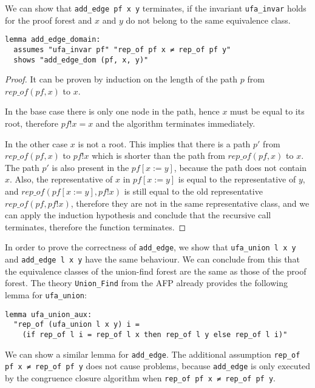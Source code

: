 We can show that \lstinline{add_edge pf x y} terminates, if the invariant \lstinline{ufa_invar} holds for the proof forest and $x$ and $y$ do not belong to the same equivalence class.

\begin{lstlisting}
lemma add_edge_domain:
  assumes "ufa_invar pf" "rep_of pf x ≠ rep_of pf y"
  shows "add_edge_dom (pf, x, y)"
\end{lstlisting}

\begin{proof}
It can be proven by induction on the length of the path $p$ from $rep\_of(pf, x)$ to $x$.

In the base case there is only one node in the path, hence $x$ must be equal to its root, therefore $pf ! x = x$ and the algorithm terminates immediately.

In the other case $x$ is not a root. This implies that there is a path $p'$ from $rep\_of(pf,x)$ to $pf!x$ which is shorter than the path from $rep\_of(pf,x)$ to $x$. The path $p'$ is also present in the $pf[x := y]$, because the path does not contain $x$. Also, the representative of $x$ in $pf[x := y]$ is equal to the representative of $y$, and $rep\_of(pf[x := y],pf!x)$ is still equal to the old representative $rep\_of(pf,pf!x)$, therefore they are not in the same representative class, and we can apply the induction hypothesis and conclude that the recursive call terminates, therefore the function terminates.
\end{proof}

In order to prove the correctness of \lstinline|add_edge|, we show that \lstinline{ufa_union l x y} and \lstinline{add_edge l x y} have the same behaviour.
We can conclude from this that the equivalence classes of the union-find forest are the same as those of the proof forest.
The theory \lstinline{Union_Find} from the AFP \cite{Sep} already provides the following lemma for \lstinline{ufa_union}:

\begin{lstlisting}
lemma ufa_union_aux:
  "rep_of (ufa_union l x y) i =
    (if rep_of l i = rep_of l x then rep_of l y else rep_of l i)"
\end{lstlisting}

We can show a similar lemma for \lstinline{add_edge}.
The additional assumption \lstinline{rep_of pf x ≠ rep_of pf y} does not cause problems, because \lstinline{add_edge} is only executed by the congruence closure algorithm when \lstinline{rep_of pf x ≠ rep_of pf y}.

